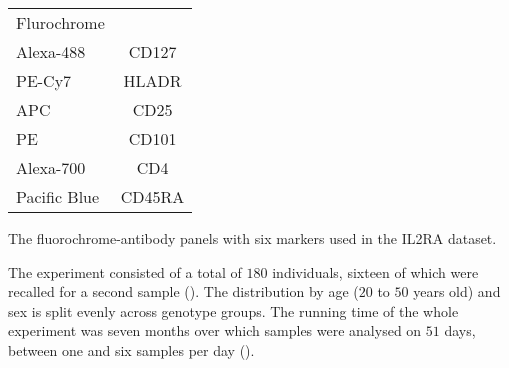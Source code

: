 \begin{table}[h]
\centering
\begin{tabular}{lc}
\rowcolor{Gray}
Flurochrome  & \\
Alexa-488    & CD127\\
PE-Cy7       & HLADR\\
APC          & CD25\\
PE           & CD101\\
Alexa-700    & CD4\\
Pacific Blue & CD45RA\\
\end{tabular}
{ The fluorochrome-antibody panels with six markers used in the IL2RA dataset.  }
{ }
\end{table}

The experiment consisted of a total of $180$ individuals, sixteen of which were recalled for a second sample ().
The distribution by age ($20$ to $50$ years old) and sex is split evenly across genotype groups.  
The running time of the whole experiment was seven months over which samples were analysed on $51$ days,
between one and six samples per day ().  

